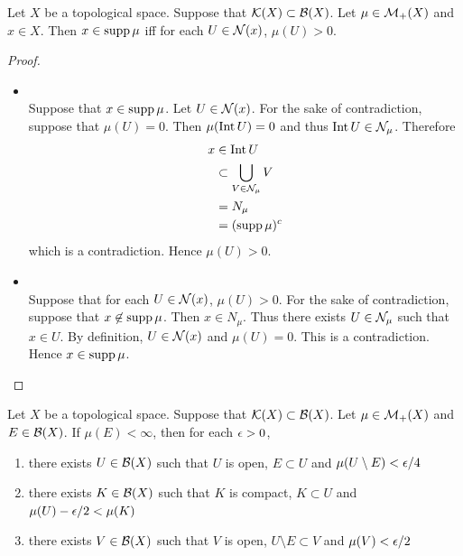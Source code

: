 \documentclass{book}
\begin{document}
	\begin{ex} 
		Let $X$ be a topological space. Suppose that $\mathcal{K}(X) \subset \mathcal{B}(X)$. Let $\mu \in \mathcal{M}_+(X)$ and $x \in X$. Then $x \in \operatorname{supp} \mu$ iff for each $U \in \mathcal{N}(x)$, $\mu(U) > 0$.
	\end{ex}

	\begin{proof}\
		\begin{itemize}
			\item \tbf{$(\implies)$: } \\
			Suppose that $x \in \operatorname{supp} \mu$. Let $U \in \mathcal{N}(x)$. For the sake of contradiction, suppose that $\mu(U) = 0$. Then $\mu(\operatorname{Int} U) = 0$ and thus $\operatorname{Int} U \in \mathcal{N}_{\mu}$. Therefore
			\begin{align*}
				x
				& \in \operatorname{Int} U \\
				& \subset \bigcup_{V \in \mathcal{N}_{\mu}} V \\
				& = N_{\mu} \\
				& = (\operatorname{supp} \mu)^c 
			\end{align*}
			which is a contradiction. Hence $\mu(U) > 0$. 
			\item \tbf{$(\impliedby)$: } \\
			Suppose that for each $U \in \mathcal{N}(x)$, $\mu(U) > 0$. For the sake of contradiction, suppose that $x \not \in \operatorname{supp} \mu$. Then $x \in N_{\mu}$. Thus there exists $U \in \mathcal{N}_{\mu}$ such that $x \in U$. By definition, $U \in \mathcal{N}(x)$ and $\mu(U) = 0$. This is a contradiction. Hence $x \in \operatorname{supp} \mu$. 
		\end{itemize}
	\end{proof}

	\begin{ex}  
		Let $X$ be a topological space. Suppose that $\mathcal{K}(X) \subset \mathcal{B}(X)$. Let $\mu \in \mathcal{M}_+(X)$ and $E \in \mathcal{B}(X)$. If $\mu(E) < \infty$, then for each $\epsilon >0$, 
		\begin{enumerate}
			\item there exists $U \in \mathcal{B}(X)$ such that $U$ is open, $E \subset U$ and $\mu(U \setminus E) < \epsilon/4$ 
			\item there exists $K \in \mathcal{B}(X)$ such that $K$ is compact, $K \subset U$ and $\mu(U) - \epsilon/2 < \mu(K)$ 
			\item there exists $V \in \mathcal{B}(X)$ such that $V$ is open, $U \setminus E \subset V$ and $\mu(V) < \epsilon/2$ 
		\end{enumerate}
	\end{ex}
	
\end{document}
